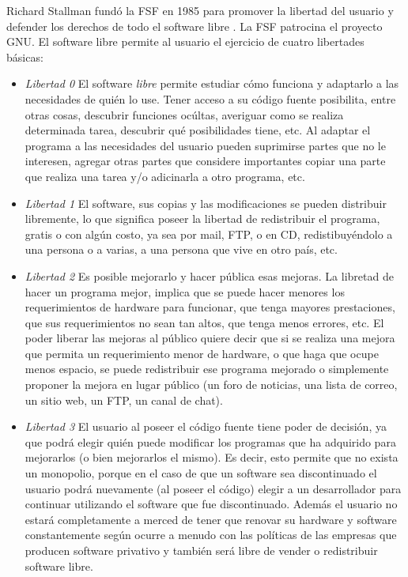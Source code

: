 	Richard Stallman fundó la FSF en 1985 para promover la libertad del usuario y defender los derechos de todo el software libre \cite{Etiqueta14}. La
	FSF patrocina el proyecto GNU. El software libre permite al usuario el ejercicio de cuatro libertades básicas:
	\begin {itemize}
	\item
 	\textit{Libertad 0} El software \textit{libre} permite estudiar cómo funciona y adaptarlo a las necesidades de quién lo use. Tener acceso a
 	su código fuente posibilita, entre otras cosas, descubrir funciones ocúltas, averiguar como se realiza determinada tarea, descubrir qué
 	posibilidades tiene, etc. Al adaptar el programa a las necesidades del usuario pueden suprimirse partes que no le interesen, agregar otras partes
 	que considere importantes copiar una parte que realiza una tarea y/o adicinarla a otro programa, etc.
	\item
	\textit{Libertad 1} El software, sus copias y las modificaciones se pueden distribuir libremente, lo que significa poseer la libertad de redistribuir
	el programa, gratis o con algún costo, ya sea por mail, FTP, o en CD, redistibuyéndolo a una persona o a varias, a una persona que vive en otro país,
	etc.
	\item 
	\textit{Libertad 2} Es posible mejorarlo y hacer pública esas mejoras. La libretad de hacer un programa mejor, implica que se puede hacer menores los
	requerimientos de hardware para funcionar, que tenga mayores prestaciones, que sus requerimientos no sean tan altos, que tenga menos errores, etc. El
	poder liberar las mejoras al público quiere decir que si se realiza una mejora que permita un requerimiento menor de hardware, o que haga que ocupe
	menos espacio, se puede redistribuir ese programa mejorado o simplemente proponer la mejora en lugar público (un foro de noticias, una lista de
	correo, un sitio web, un FTP, un canal de chat).
	\item 
	\textit{Libertad 3} El usuario al poseer el código fuente tiene poder de decisión, ya que podrá elegir quién puede modificar los programas que ha
	adquirido para mejorarlos (o bien mejorarlos el mismo). Es decir, esto permite que no exista un monopolio, porque en el caso de que un software sea
	discontinuado el usuario podrá nuevamente (al poseer el código) elegir a un desarrollador para continuar utilizando el software que fue
	discontinuado. Además el usuario no estará completamente a merced de tener que renovar su hardware y software constantemente según ocurre a menudo
	con las políticas de las empresas que producen software privativo y también será libre de vender o redistribuir software libre.
 	\end {itemize}
 	
